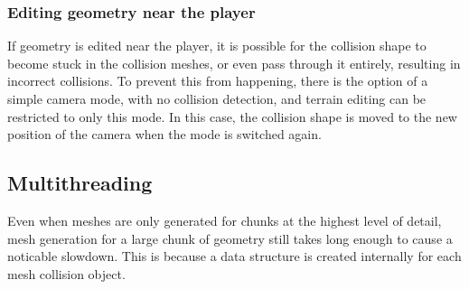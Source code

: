 \documentclass[11pt]{article}
\begin{document}
\subsubsection{Editing geometry near the player}
If geometry is edited near the player, it is possible for the collision shape to become stuck in the collision meshes, or even pass through it entirely, resulting in incorrect collisions. To prevent this from happening, there is the option of a simple camera mode, with no collision detection, and terrain editing can be restricted to only this mode. In this case, the collision shape is moved to the new position of the camera when the mode is switched again.
\subsection{Multithreading}
\label{section:multithreading}
Even when meshes are only generated for chunks at the highest level of detail, mesh generation for a large chunk of geometry still takes long enough to cause a noticable slowdown. This is because a data structure is created internally for each mesh collision object.
\end{document}
